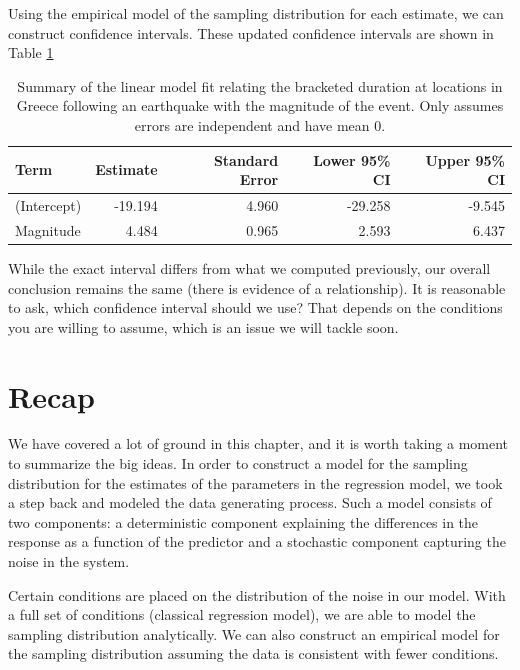 \documentclass[
]{book}
\theoremstyle{plain}
\theoremstyle{mydefn}
\theoremstyle{myexmpl}
\theoremstyle{remark}
\begin{document}
Using the empirical model of the sampling distribution for each estimate, we can construct confidence intervals. These updated confidence intervals are shown in Table \ref{tab:regconditions-slr-summary-alt}

\begin{table}

\caption{\label{tab:regconditions-slr-summary-alt}Summary of the linear model fit relating the bracketed duration at locations in Greece following an earthquake with the magnitude of the event. Only assumes errors are independent and have mean 0.}
\centering
\begin{tabular}[t]{l|r|r|r|r}
\hline
Term & Estimate & Standard Error & Lower 95\% CI & Upper 95\% CI\\
\hline
(Intercept) & -19.194 & 4.960 & -29.258 & -9.545\\
\hline
Magnitude & 4.484 & 0.965 & 2.593 & 6.437\\
\hline
\end{tabular}
\end{table}

While the exact interval differs from what we computed previously, our overall conclusion remains the same (there is evidence of a relationship). It is reasonable to ask, which confidence interval should we use? That depends on the conditions you are willing to assume, which is an issue we will tackle soon.

\hypertarget{recap}{%
\section{Recap}\label{recap}}

We have covered a lot of ground in this chapter, and it is worth taking a moment to summarize the big ideas. In order to construct a model for the sampling distribution for the estimates of the parameters in the regression model, we took a step back and modeled the data generating process. Such a model consists of two components: a deterministic component explaining the differences in the response as a function of the predictor and a stochastic component capturing the noise in the system.

Certain conditions are placed on the distribution of the noise in our model. With a full set of conditions (classical regression model), we are able to model the sampling distribution analytically. We can also construct an empirical model for the sampling distribution assuming the data is consistent with fewer conditions.
\end{document}
